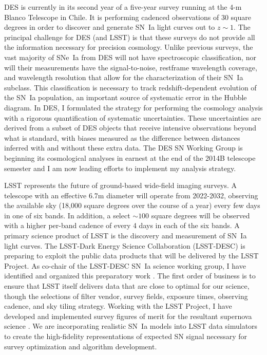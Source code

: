 \documentclass[12pt]{article}
\begin{document}
DES is currently in its second year of a five-year survey running at the 4-m Blanco Telescope in Chile.  It is performing
cadenced observations of 30 square degrees in order to discover and generate SN~Ia light curves out
to $z\sim1$.
The principal challenge for DES (and LSST) is that these surveys do
not provide all the information necessary for precision cosmology.
Unlike previous surveys, the vast majority of SNe~Ia from DES
will not have spectroscopic classification, nor will their
measurements have the signal-to-noise, restframe wavelength coverage, and wavelength resolution that allow  for
the characterization of their SN~Ia subclass.  This classification is necessary to track redshift-dependent evolution of 
the SN~Ia population, an important source of systematic error in the Hubble diagram.  In DES, I  formulated the strategy for performing the cosmology analysis
with a rigorous quantification of systematic uncertainties.  These uncertainties are  derived from a subset of 
DES objects that receive intensive observations beyond what is standard, with
biases measured as the difference between distances inferred with
and without these extra data. 
The DES SN Working Group is beginning its cosmological analyses in earnest at the end
of the 2014B telescope semester and I am now leading efforts to implement my analysis strategy.

LSST  represents the future of ground-based wide-field imaging surveys.
A telescope with an effective 6.7m diameter will operate from 2022-2032, observing the available sky (18,000 square degrees over the course
of a year)
every few days in one of six bands.  In addition, a select $\sim 100$ square degrees will be observed with a higher per-band
cadence of every 4 days
in each of the six bands.
A primary science product of LSST is the discovery and measurement of SN~Ia light curves.
The LSST-Dark Energy Science Collaboration (LSST-DESC) is preparing
to exploit  the public data products that will be
delivered by the  LSST Project.  As co-chair of the LSST-DESC  SN~Ia science working group,
 I have identified and organized this preparatory work \cite{2012arXiv1211.0310L}.
The first order of business is to ensure that LSST itself delivers data that are  close to optimal for our science, though
the selections of filter vendor, survey fields, exposure times, observing cadence, and sky tiling strategy.
Working with the LSST Project\iftoggle{UW}{ (including UW colleagues)}{},
I have developed and implemented survey figures of merit for the resultant supernova science
\cite{LSSTCadence}.  
We are incorporating realistic SN~Ia models  into LSST  data simulators to create the high-fidelity representations
of expected SN signal necessary for survey optimization and algorithm development.
\iftoggle{UW}{Progress on this ongoing work will be
facilitated by my being co-located with key players in the LSST Project.}{}
\end{document}
